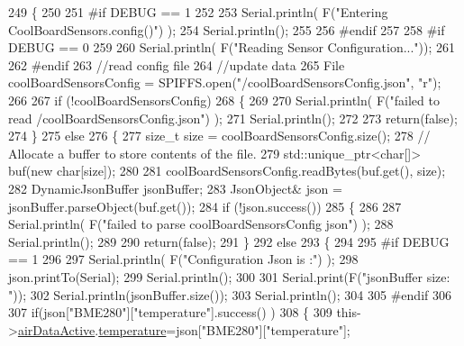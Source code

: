 \begin{DoxyCode}
249 \{
250 
251 \textcolor{preprocessor}{#if DEBUG == 1}
252 
253     Serial.println( F(\textcolor{stringliteral}{"Entering CoolBoardSensors.config()"}) );
254     Serial.println();
255 
256 \textcolor{preprocessor}{#endif}
257 
258 \textcolor{preprocessor}{#if DEBUG == 0}
259 
260     Serial.println( F(\textcolor{stringliteral}{"Reading Sensor Configuration..."}));
261 
262 \textcolor{preprocessor}{#endif}
263     \textcolor{comment}{//read config file}
264     \textcolor{comment}{//update data}
265     File coolBoardSensorsConfig = SPIFFS.open(\textcolor{stringliteral}{"/coolBoardSensorsConfig.json"}, \textcolor{stringliteral}{"r"});
266 
267     \textcolor{keywordflow}{if} (!coolBoardSensorsConfig) 
268     \{
269     
270         Serial.println( F(\textcolor{stringliteral}{"failed to read /coolBoardSensorsConfig.json"}) );
271         Serial.println();
272 
273         \textcolor{keywordflow}{return}(\textcolor{keyword}{false});
274     \}
275     \textcolor{keywordflow}{else}
276     \{
277         \textcolor{keywordtype}{size\_t} size = coolBoardSensorsConfig.size();
278         \textcolor{comment}{// Allocate a buffer to store contents of the file.}
279         std::unique\_ptr<char[]> buf(\textcolor{keyword}{new} \textcolor{keywordtype}{char}[size]);
280 
281         coolBoardSensorsConfig.readBytes(buf.get(), size);
282         DynamicJsonBuffer jsonBuffer;
283         JsonObject& json = jsonBuffer.parseObject(buf.get());
284         \textcolor{keywordflow}{if} (!json.success()) 
285         \{
286 
287             Serial.println( F(\textcolor{stringliteral}{"failed to parse coolBoardSensorsConfig json"}) );
288             Serial.println();
289     
290             \textcolor{keywordflow}{return}(\textcolor{keyword}{false});
291         \} 
292         \textcolor{keywordflow}{else}
293         \{
294 
295 \textcolor{preprocessor}{        #if DEBUG == 1}
296 
297             Serial.println( F(\textcolor{stringliteral}{"Configuration Json is :"}) );
298             json.printTo(Serial);
299             Serial.println();
300 
301             Serial.print(F(\textcolor{stringliteral}{"jsonBuffer size: "}));
302             Serial.println(jsonBuffer.size());
303             Serial.println();
304         
305 \textcolor{preprocessor}{        #endif}
306             
307             \textcolor{keywordflow}{if}(json[\textcolor{stringliteral}{"BME280"}][\textcolor{stringliteral}{"temperature"}].success() )
308             \{           
309                 this->\hyperlink{class_cool_board_sensors_abff8dfeccb2f7689847bb64d5f1cd31e}{airDataActive}.\hyperlink{struct_cool_board_sensors_1_1air_active_ac08576736c7ac3bfbfec32e5ee17c686}{temperature}=json[\textcolor{stringliteral}{"BME280"}][\textcolor{stringliteral}{"temperature"}];

\end{DoxyCode}
